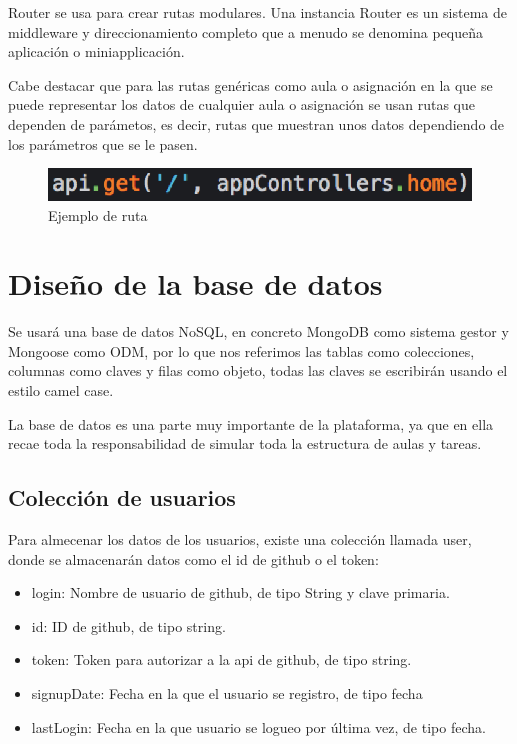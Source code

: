 Router se usa para crear rutas modulares. Una instancia Router es un sistema de middleware y direccionamiento completo que a menudo se denomina pequeña aplicación o miniapplicación.

Cabe destacar que para las rutas genéricas como aula o asignación en la que se puede representar los datos de cualquier aula o asignación se usan rutas que dependen de parámetos, es decir, rutas que muestran unos datos dependiendo de los parámetros que se le pasen.

\begin{figure}[!th]
\begin{center}
\includegraphics[scale=1.0]{images/ruta}
\caption{Ejemplo de ruta}
\label{fig:Ejemplo de ruta}
\end{center}
\end{figure}


\section{Diseño de la base de datos}
\label{:sec4}

Se usará una base de datos NoSQL, en concreto MongoDB como sistema gestor y Mongoose como ODM, por lo que nos referimos las tablas como colecciones, columnas como claves y filas como objeto, todas las claves se escribirán usando el estilo camel case.

La base de datos es una parte muy importante de la plataforma, ya que en ella recae toda la responsabilidad de simular toda la estructura de aulas y tareas.

\subsection{Colección de usuarios}
\label{3:4:1}

Para almecenar los datos de los usuarios, existe una colección llamada user, donde se almacenarán datos como el id de github o el token:

\begin{itemize}
  \item login: Nombre de usuario de github, de tipo String y clave primaria.
  \item id: ID de github, de tipo string.
  \item token: Token para autorizar a la api de github, de tipo string.
  \item signupDate: Fecha en la que el usuario se registro, de tipo fecha
  \item lastLogin: Fecha en la que usuario se logueo por última vez, de tipo fecha.
\end{itemize}

